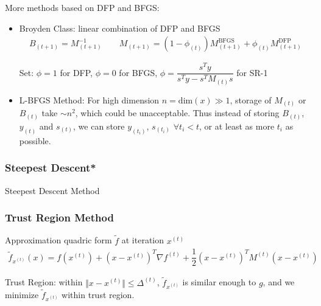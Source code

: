     \begin{point}
        More methods based on DFP and BFGS:
    \end{point}
    
\begin{itemize}[topsep=2pt,itemsep=0pt]
    \item Broyden Class: linear combination of DFP and BFGS
    \begin{align}
        B_{(t+1)}=M_{(t+1)}^{-1}\qquad M _{(t+1)}=(1-\phi_{(t)})M_{(t+1)}^\mathrm{BFGS}+\phi _{(t)}M_{(t+1)}^\mathrm{DFP} 
    \end{align}

    Set: $ \phi =1 $ for DFP, $ \phi =0 $ for BFGS, $ \phi =\dfrac{s^Ty}{s^Ty-s^TM_{(t)}s} $ for SR-1
    
    
    \item L-BFGS Method: For high dimension $ n=\mathrm{dim}(x)\gg 1  $, storage of $ M_{(t)} $ or $ B_{(t)} $ take $ \sim n^2 $, which could be unacceptable. Thus instead of storing $ B_{(t)} $, $ y_{(t)} $ and $ s_{(t)} $, we can store $ y_{(t_i)} $, $ s_{(t_i)} $ $ \forall t_i<t $, or at least as more $ t_i $ as possible.

\end{itemize}

\subsubsection{Steepest Descent*}
\hypertarget{SteepestDescent}{Steepest Descent Method}






\subsubsection{Trust Region Method}\label{SubSubSectionTrustRegion}
\hypertarget{TrustRegion}{}
    Approximation quadric form $ \tilde{f} $ at iteration $ x^{(t)} $
    \begin{align}
        \tilde{f}_{x^{(t)}}(x)=f(x^{(t)})+ \left(x-x^{(t)}\right)^T\nabla f^{(t)}+\dfrac{1}{2}\left(x-x^{(t)}\right)^TM^{(t)}\left(x-x^{(t)}\right)
    \end{align}
    
    Trust Region: within $ \Vert x-x^{(t)} \Vert\leq \Delta ^{(t)}  $, $ \tilde{f}_{x^{(t)}}  $ is similar enough to $ g $, and we minimize $ \tilde{f}_{x^{(t)}} $ within trust region.

